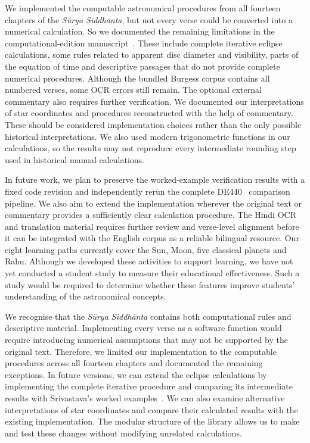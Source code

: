 \documentclass[12pt,a4paper,oneside]{report}
\newcommand{\surya}{Sūrya Siddhānta\xspace}
\begin{document}
We implemented the computable astronomical procedures from all fourteen chapters of the \emph{\surya}, but not every verse could be converted into a numerical calculation. So we documented the remaining limitations in the computational-edition manuscript~\cite{nigam2026edition}. These include complete iterative eclipse calculations, some rules related to apparent disc diameter and visibility, parts of the equation of time and descriptive passages that do not provide complete numerical procedures. Although the bundled Burgess corpus contains all numbered verses, some OCR errors still remain. The optional external commentary also requires further verification. We documented our interpretations of star coordinates and procedures reconstructed with the help of commentary. These should be considered implementation choices rather than the only possible historical interpretations. We also used modern trigonometric functions in our calculations, so the results may not reproduce every intermediate rounding step used in historical manual calculations.

In future work, we plan to preserve the worked-example verification results with a fixed code revision and independently rerun the complete DE440~\cite{Park2021DE440} comparison pipeline. We also aim to extend the implementation wherever the original text or commentary provides a sufficiently clear calculation procedure. The Hindi OCR and translation material requires further review and verse-level alignment before it can be integrated with the English corpus as a reliable bilingual resource. Our eight learning paths currently cover the Sun, Moon, five classical planets and Rahu. Although we developed these activities to support learning, we have not yet conducted a student study to measure their educational effectiveness. Such a study would be required to determine whether these features improve students' understanding of the astronomical concepts.

We recognise that the \emph{\surya} contains both computational rules and descriptive material. Implementing every verse as a software function would require introducing numerical assumptions that may not be supported by the original text. Therefore, we limited our implementation to the computable procedures across all fourteen chapters and documented the remaining exceptions. In future versions, we can extend the eclipse calculations by implementing the complete iterative procedure and comparing its intermediate results with Srivastava's worked examples~\cite{shrivastava}. We can also examine alternative interpretations of star coordinates and compare their calculated results with the existing implementation. The modular structure of the library allows us to make and test these changes without modifying unrelated calculations.
\end{document}
